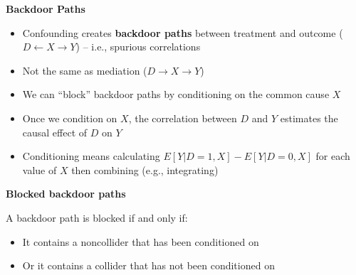 \documentclass[notes=show]{beamer}
\begin{document}
\begin{frame}[plain]
\begin{center}
\textbf{Backdoor Paths}
\end{center}

\begin{itemize}
		\item Confounding creates \textbf{backdoor paths} between treatment and outcome ($D\leftarrow X\rightarrow Y$) -- i.e., spurious correlations
		\item Not the same as mediation ($D \rightarrow X \rightarrow Y$)
		\item We can ``block'' backdoor paths by conditioning on the common cause $X$
		\item Once we condition on $X$, the correlation between $D$ and $Y$ estimates the causal effect of $D$ on $Y$
		\item Conditioning means calculating $E[Y|D=1,X]-E[Y|D=0,X]$ for each value of $X$ then combining (e.g., integrating)

\end{itemize}	
	
		\begin{center}
		\end{center}
	
\end{frame}


\begin{frame}[plain]
\begin{center}
\textbf{Blocked backdoor paths}
\end{center}

	A backdoor path is blocked if and only if:
	\begin{itemize}
		\item It contains a noncollider that has been conditioned on
		\item Or it contains a collider that has not been conditioned on 
	\end{itemize}

\end{frame}
\end{document}
